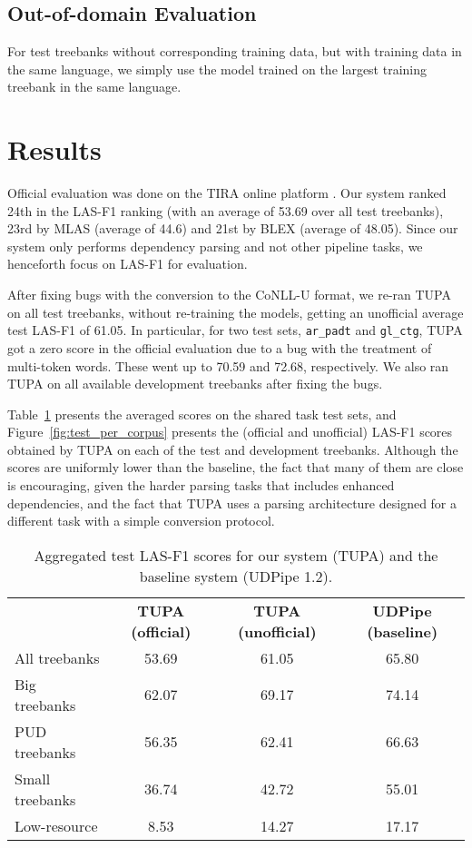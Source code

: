 \documentclass[11pt,a4paper]{article}
\begin{document}
\subsection{Out-of-domain Evaluation}

For test treebanks without corresponding training data,
but with training data in the same language,
we simply use the model trained on the largest training treebank in the same language.


\section{Results}\label{sec:results}

Official evaluation was done on the TIRA online platform \cite{tira}.
Our system ranked 24th in the LAS-F1 ranking
(with an average of 53.69 over all test treebanks),
23rd by MLAS (average of 44.6) and 21st by BLEX (average of 48.05).
Since our system only performs dependency parsing and not other pipeline tasks,
we henceforth focus on LAS-F1 \cite{nivre17udw} for evaluation.

After fixing bugs with the conversion to the CoNLL-U format,
we re-ran TUPA on all test treebanks, without re-training the models,
getting an unofficial average test LAS-F1 of 61.05.
In particular, for two test sets, \verb|ar_padt| and \verb|gl_ctg|, TUPA got
a zero score in the official evaluation due to a bug with the treatment of multi-token words.
These went up to 70.59 and 72.68, respectively.
We also ran TUPA on all available development treebanks after fixing the bugs.

Table~\ref{tab:overall_results} presents the
averaged scores on the shared task test sets,
and Figure~\ref{fig:test_per_corpus} presents the (official and unofficial) LAS-F1
scores obtained by TUPA on each of the test and development treebanks.
Although the scores are uniformly lower than the baseline,
the fact that many of them are close is encouraging,
given the harder parsing tasks that includes enhanced dependencies,
and the fact that TUPA uses a
parsing architecture designed for a different task
with a simple conversion protocol.

\begin{table}
\begin{tabular}{lccc}
\hline
& \multirow{2}{13mm}{\bf TUPA {\small(official)}} & \multirow{2}{13mm}{\bf TUPA {\small(unofficial)}}
& \multirow{2}{13mm}{\bf UDPipe {\small(baseline)}} \\\\
\hline
All treebanks & 53.69 & 61.05 & 65.80 \\
Big treebanks & 62.07 & 69.17 & 74.14 \\
PUD treebanks & 56.35 & 62.41 & 66.63 \\
Small treebanks & 36.74 & 42.72 & 55.01 \\
Low-resource & 8.53 & 14.27 & 17.17
\end{tabular}
\caption{Aggregated test LAS-F1 scores
for our system (TUPA) and the baseline system (UDPipe 1.2).
\label{tab:overall_results}}
\end{table}
\end{document}

